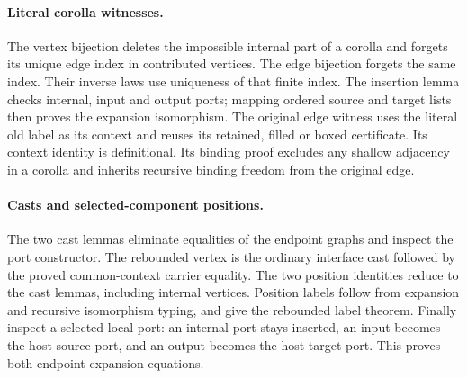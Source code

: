 
\paragraph{Literal corolla witnesses.}
The vertex bijection deletes the impossible internal part of a corolla and
forgets its unique edge index in contributed vertices. The edge bijection
forgets the same index. Their inverse laws use uniqueness of that finite index.
The insertion lemma checks internal, input and output ports; mapping ordered
source and target lists then proves the expansion isomorphism. The original
edge witness uses the literal old label as its context and reuses its retained,
filled or boxed certificate. Its context identity is definitional. Its binding
proof excludes any shallow adjacency in a corolla and inherits recursive
binding freedom from the original edge.

\par{}

\paragraph{Casts and selected-component positions.}
The two cast lemmas eliminate equalities of the endpoint graphs and inspect
the port constructor. The rebounded vertex is the ordinary interface cast
followed by the proved common-context carrier equality. The two position
identities reduce to the cast lemmas, including internal vertices. Position
labels follow from expansion and recursive isomorphism typing, and give the
rebounded label theorem. Finally inspect a selected local port: an internal
port stays inserted, an input becomes the host source port, and an output
becomes the host target port. This proves both endpoint expansion equations.

